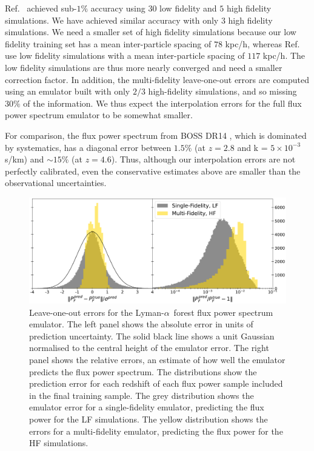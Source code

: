 \documentclass[a4paper,11pt]{article}
\newcommand{\Lya}{Lyman-$\alpha$}
\begin{document}
Ref.~\cite{Fernandez:2022} achieved sub-$1\%$ accuracy using $30$ low fidelity and $5$ high fidelity simulations. We have achieved similar accuracy with only $3$ high fidelity simulations. We need a smaller set of high fidelity simulations because our low fidelity training set has a mean inter-particle spacing of $78$ kpc/h, whereas Ref.~\cite{Fernandez:2022} use low fidelity simulations with a mean inter-particle spacing of $117$ kpc/h. The low fidelity simulations are thus more nearly converged and need a smaller correction factor. In addition, the multi-fidelity leave-one-out errors are computed using an emulator built with only $2/3$ high-fidelity simulations, and so missing $30\%$ of the information. We thus expect the interpolation errors for the full flux power spectrum emulator to be somewhat smaller.


For comparison, the flux power spectrum from BOSS DR14 \cite{Chabanier:2019}, which is dominated by systematics, has a diagonal error between $1.5\%$ (at $z=2.8$ and k = $5\times 10^{-3}$ s/km) and $\sim 15\%$ (at $z=4.6$). Thus, although our interpolation errors are not perfectly calibrated, even the conservative estimates above are smaller than the observational uncertainties.

\begin{figure}
    \centering
    \includegraphics[width=\textwidth]{figures/fpsemu_errors.pdf}
    \caption{\label{fig:fps_error}
    Leave-one-out errors for the \Lya~forest flux power spectrum emulator.
    The left panel shows the absolute error in units of prediction uncertainty. The solid black line shows a unit Gaussian normalised to the central height of the emulator error.
    The right panel shows the relative errors, an estimate of how well the emulator predicts the flux power spectrum.
    The distributions show the prediction error for each redshift of each flux power sample included in the final training sample.
    The grey distribution shows the emulator error for a single-fidelity emulator, predicting the flux power for the LF simulations.
    The yellow distribution shows the errors for a multi-fidelity emulator, predicting the flux power for the HF simulations.
    }
\end{figure}
\end{document}
